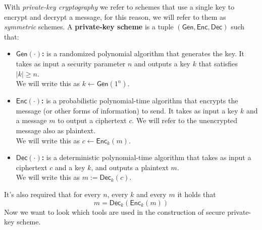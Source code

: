 With \emph{private-key cryptography} we refer to schemes that use a single key to encrypt and decrypt a message, for this reason, we will refer to them as \emph{symmetric} schemes.
A \textbf{private-key scheme} is a tuple $(\mathsf{Gen}, \mathsf{Enc}, \mathsf{Dec})$ such that:
\begin{itemize}
    \item{\textbf{$\mathsf{Gen}(\cdot)$:} is a randomized polynomial algorithm that generates the key. It takes as input a security parameter $n$ and outputs a key $k$ that satisfies $|k| \geq n$.\\
        We will write this as $k \leftarrow \mathsf{Gen}(1^n)$.}
    \item{\textbf{$\mathsf{Enc}(\cdot)$:} is a probabilistic polynomial-time algorithm that encrypts the message (or other forms of information) to send. It takes as input a key $k$ and a message $m$ to output a ciphertext $c$. We will refer to the unencrypted message also as plaintext.\\
        We will write this as $c \leftarrow \mathsf{Enc}_k(m)$.}
    \item{\textbf{$\mathsf{Dec}(\cdot)$:} is a deterministic polynomial-time algorithm that takes as input a ciphertext $c$ and a key $k$, and outputs a plaintext $m$.\\
        We will write this as $m := \mathsf{Dec}_k(c)$.}
\end{itemize}
It's also required that for every $n$, every $k$ and every $m$ it holds that
$$
m = \mathsf{Dec}_k(\mathsf{Enc}_k(m))
$$
Now we want to look which tools are used in the construction of secure private-key scheme.
